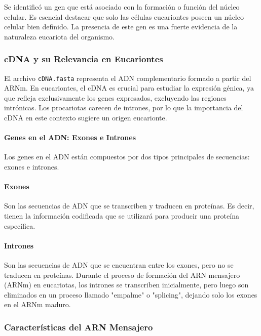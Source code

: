 Se identificó un gen que está asociado con la formación o función del núcleo celular. Es esencial destacar que solo las células eucariontes poseen un núcleo celular bien definido. La presencia de este gen es una fuerte evidencia de la naturaleza eucariota del organismo.

\subsubsection*{cDNA y su Relevancia en Eucariontes}

El archivo \texttt{cDNA.fasta} representa el ADN complementario formado a partir del ARNm. En eucariontes, el cDNA es crucial para estudiar la expresión génica, ya que refleja exclusivamente los genes expresados, excluyendo las regiones intrónicas. Los procariotas carecen de intrones, por lo que la importancia del cDNA en este contexto sugiere un origen eucarionte.

\paragraph{Genes en el ADN: Exones e Intrones}

Los genes en el ADN están compuestos por dos tipos principales de secuencias: exones e intrones.

\paragraph{Exones}

Son las secuencias de ADN que se transcriben y traducen en proteínas. Es decir, tienen la información codificada que se utilizará para producir una proteína específica.

\paragraph{Intrones}

Son las secuencias de ADN que se encuentran entre los exones, pero no se traducen en proteínas. Durante el proceso de formación del ARN mensajero (ARNm) en eucariotas, los intrones se transcriben inicialmente, pero luego son eliminados en un proceso llamado "empalme" o "splicing", dejando solo los exones en el ARNm maduro.

\subsubsection*{Características del ARN Mensajero}

